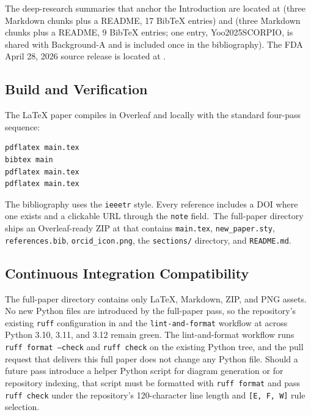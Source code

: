 The deep-research summaries that anchor the Introduction are located
at  (three Markdown
chunks plus a README, 17 BibTeX entries) and
 (three Markdown
chunks plus a README, 9 BibTeX entries; one entry, Yoo2025SCORPIO, is
shared with Background-A and is included once in the bibliography).
The FDA April 28, 2026 source release is located at
\cite{fda2026realtime}.

\subsection{Build and Verification}
\label{sec:methods-build}

The LaTeX paper compiles in Overleaf and locally with the standard
four-pass sequence:
\begin{verbatim}
pdflatex main.tex
bibtex main
pdflatex main.tex
pdflatex main.tex
\end{verbatim}

The bibliography uses the \texttt{ieeetr} style. Every reference
includes a DOI where one exists and a clickable URL through the
\texttt{note} field.\ The full-paper directory ships an Overleaf-ready
ZIP at
that contains \texttt{main.tex}, \texttt{new\_paper.sty},
\texttt{references.bib}, \texttt{orcid\_icon.png}, the
\texttt{sections/} directory, and \texttt{README.md}.

\subsection{Continuous Integration Compatibility}
\label{sec:methods-ci}

The full-paper directory contains only LaTeX, Markdown, ZIP, and PNG
assets. No new Python files are introduced by the full-paper pass, so
the repository's existing \texttt{ruff} configuration in
 and the \texttt{lint-and-format} workflow at
 across Python 3.10, 3.11, and 3.12
remain green. The lint-and-format workflow runs \texttt{ruff format
--check} and \texttt{ruff check} on the existing Python tree, and the
pull request that delivers this full paper does not change any Python
file. Should a future pass introduce a helper Python script for
diagram generation or for repository indexing, that script must be
formatted with \texttt{ruff format} and pass \texttt{ruff check} under
the repository's 120-character line length and \texttt{[E, F, W]} rule
selection.

